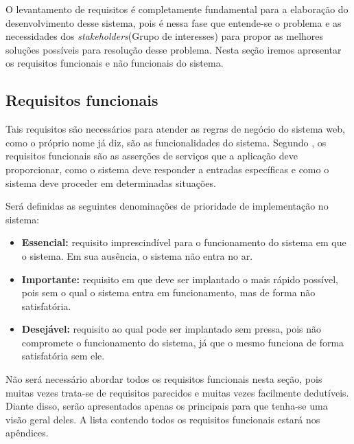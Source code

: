 O levantamento de requisitos é completamente fundamental para a elaboração do desenvolvimento desse sistema, pois é nessa fase que entende-se o problema e as necessidades dos \textit{stakeholders}(Grupo de interesses) para propor as melhores soluções possíveis para resolução desse problema. Nesta seção iremos apresentar os requisitos funcionais e não funcionais do sistema.

\subsection{Requisitos funcionais}

Tais requisitos são necessários para atender as regras de negócio do sistema web, como o próprio nome já diz, são as funcionalidades do sistema.  Segundo \cite{sommerville2007engenharia}, os requisitos funcionais são as asserções de serviços que a aplicação deve proporcionar, como o sistema deve responder a entradas específicas e como o sistema deve proceder em determinadas situações. \par
Será definidas as seguintes denominações de prioridade de implementação no sistema:
\begin{itemize}  
\item \textbf{Essencial:} requisito imprescindível para o funcionamento do sistema em que o sistema. Em sua ausência, o sistema não entra no ar.
\item \textbf{Importante:} requisito em que deve ser implantado o mais rápido possível, pois sem o qual o sistema entra em funcionamento, mas de forma não satisfatória.
\item \textbf{Desejável:} requisito ao qual pode ser implantado sem pressa, pois não compromete o funcionamento do sistema, já que o mesmo funciona de forma satisfatória sem ele.
\end{itemize} \par
Não será necessário abordar todos os requisitos funcionais nesta seção, pois muitas vezes trata-se de requisitos parecidos e muitas vezes facilmente dedutíveis. Diante disso, serão apresentados apenas os principais para que tenha-se uma visão geral deles. A lista contendo todos os requisitos funcionais estará nos apêndices.

